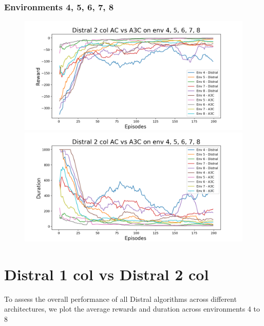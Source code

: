 \documentclass[12pt]{report}
\begin{document}
\subsubsection{Environments 4, 5, 6, 7, 8}
\begin{figure}[H]
\centering
\begin{minipage}{.5\textwidth}
\centering
\includegraphics[width=\textwidth]{figs/d2_col_ac/d2_col_ac_4_5_6_7_8_rwd.png}
\end{minipage}%
\centering
\begin{minipage}{.5\textwidth}
\centering
\includegraphics[width=\textwidth]{figs/d2_col_ac/d2_col_ac_4_5_6_7_8_dur.png}
\end{minipage}%
\end{figure}


\section{Distral 1 col vs Distral 2 col}

To assess the overall performance of all Distral algorithms across different architectures, we plot the average rewards and duration across environments 4 to 8
\end{document}
